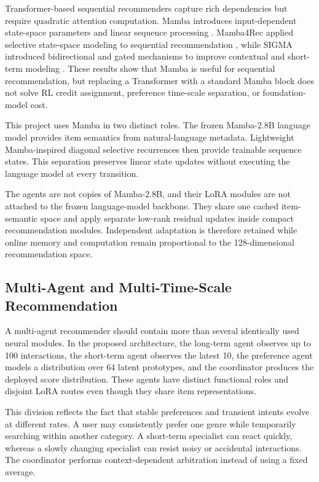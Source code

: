 \documentclass[11pt,a4paper]{article}
\begin{document}
Transformer-based sequential recommenders capture rich dependencies but require quadratic attention computation. Mamba introduces input-dependent state-space parameters and linear sequence processing \cite{MAMBA}. Mamba4Rec applied selective state-space modeling to sequential recommendation \cite{MAMBA4REC}, while SIGMA introduced bidirectional and gated mechanisms to improve contextual and short-term modeling \cite{SIGMA}. These results show that Mamba is useful for sequential recommendation, but replacing a Transformer with a standard Mamba block does not solve RL credit assignment, preference time-scale separation, or foundation-model cost.

This project uses Mamba in two distinct roles. The frozen Mamba-2.8B language model provides item semantics from natural-language metadata. Lightweight Mamba-inspired diagonal selective recurrences then provide trainable sequence states. This separation preserves linear state updates without executing the language model at every transition.

The agents are not copies of Mamba-2.8B, and their LoRA modules are not attached
to the frozen language-model backbone. They share one cached item-semantic space
and apply separate low-rank residual updates inside compact recommendation
modules. Independent adaptation is therefore retained while online memory and
computation remain proportional to the 128-dimensional recommendation space.

\subsection{Multi-Agent and Multi-Time-Scale Recommendation}

A multi-agent recommender should contain more than several identically used neural modules. In the proposed architecture, the long-term agent observes up to 100 interactions, the short-term agent observes the latest 10, the preference agent models a distribution over 64 latent prototypes, and the coordinator produces the deployed score distribution. These agents have distinct functional roles and disjoint LoRA routes even though they share item representations.

This division reflects the fact that stable preferences and transient intents evolve at different rates. A user may consistently prefer one genre while temporarily searching within another category. A short-term specialist can react quickly, whereas a slowly changing specialist can resist noisy or accidental interactions. The coordinator performs context-dependent arbitration instead of using a fixed average.
\end{document}
